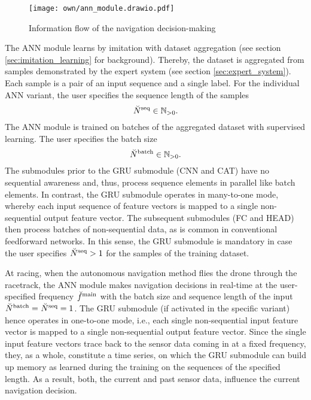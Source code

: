\begin{figure}[h]
    \centering
    \texttt{[image: own/ann\_module.drawio.pdf]}
    \caption[
        Information flow of the navigation decision-making
    ]{
        Information flow of the navigation decision-making
    \label{fig:perception_and_reasoning}
    }
\end{figure}


The ANN module learns by
imitation with dataset aggregation
(see section \ref{sec:imitation_learning} for background).
Thereby, the dataset is aggregated from samples demonstrated by the expert
system (see section \ref{sec:expert_system}).
Each sample is a pair of an input sequence and a single label.
For the individual ANN variant,
the user specifies the sequence length of the samples
\begin{equation} \label{eq:seq_len}
    {}_{}^{} \breve{N}^{\text{seq}}_{} \in \mathbb{N}_{>0}.
\end{equation}
The ANN module is trained on
batches of the aggregated dataset with supervised learning.
The user specifies the batch size
\begin{equation}
    {}_{}^{} \breve{N}^{\text{batch}}_{} \in \mathbb{N}_{>0}.
\end{equation}
The submodules prior to the GRU submodule (CNN and CAT)
have no sequential awareness and, thus, 
process sequence elements in parallel like batch elements.
In contrast, the GRU submodule
operates in many-to-one mode,
whereby each input sequence of feature vectors is mapped to a 
single non-sequential output feature vector.
The subsequent submodules (FC and HEAD)
then process batches of non-sequential data, 
as is common in conventional feedforward networks.
In this sense,
the GRU submodule is mandatory in case the user specifies
${}_{}^{} \breve{N}^{\text{seq}}_{} > 1$ for the samples of the training dataset.

At racing,
when the autonomous navigation method flies the drone through the racetrack,
the ANN module makes navigation decisions 
in real-time at the user-specified frequency
${}_{}^{} \breve{f}^{\text{main}}_{}$ with the batch size and sequence length 
of the input
${}_{}^{} \breve{N}^{\text{batch}}_{} = {}_{}^{} \breve{N}^{\text{seq}}_{} =1$.
The GRU submodule (if activated in the specific variant) 
hence operates in one-to-one mode,
i.e., 
each single non-sequential input feature vector
is mapped to a single non-sequential output feature vector.
Since the single input feature vectors 
trace back to the sensor data coming in at a fixed frequency,
they, as a whole, constitute a time series,
on which the GRU submodule can build up memory
as learned during the training on the sequences of the specified length.
As a result, both, the current and past sensor data, 
influence the current navigation decision.





